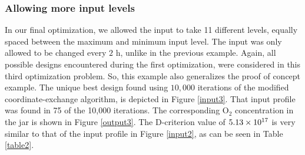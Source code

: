 \subsubsection{Allowing more input levels}
\label{Experiment3}
In our final optimization, we allowed the input to take 11 different levels, equally spaced between the maximum and minimum input level. The input was only allowed to be changed every $2 \text{ h}$, unlike in the previous example. Again, all possible designs encountered during the first optimization, were considered in this third optimization problem. So, this example also generalizes the proof of concept example. The unique best design found using $10,000$ iterations of the modified coordinate-exchange algorithm, is depicted in Figure \ref{input3}. That input profile was found in 75 of the 10,000 iterations. The corresponding $\text{O}_2$ concentration in the jar is shown in Figure \ref{output3}. The D-criterion value of $5.13\times 10^{17}$ is very similar to that of the input profile in Figure \ref{input2}, as can be seen in Table \ref{table2}.
